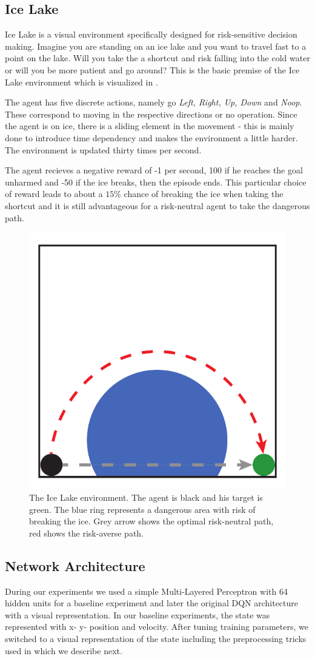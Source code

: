 \subsection{Ice Lake}
Ice Lake is a visual environment specifically designed for risk-sensitive decision making. Imagine you are standing on an ice lake and you want to travel fast to a point on the lake. Will you take the a shortcut and risk falling into the cold water or will you be more patient and go around? This is the basic premise of the Ice Lake environment which is visualized in .

The agent has five discrete actions, namely go \textit{Left, Right, Up, Down} and \textit{Noop}. These correspond to moving in the respective directions or no operation. Since the agent is on ice, there is a sliding element in the movement - this is mainly done to introduce time dependency and makes the environment a little harder. The environment is updated thirty times per second.

The agent recieves a negative reward of -1 per second, 100 if he reaches the goal unharmed and -50 if the ice breaks, then the episode ends. This particular choice of reward leads to about a $15\%$ chance of breaking the ice when taking the shortcut and it is still advantageous for a risk-neutral agent to take the dangerous path.

\begin{figure}[h]
\center
\includegraphics[width=0.3\linewidth]{gfx/icelake_still.pdf}
\caption{The Ice Lake environment. The agent is black and his target is green. The blue ring represents a dangerous area with risk of breaking the ice. Grey arrow shows the optimal risk-neutral path, red shows the risk-averse path.}
\label{fig:icelake}
\end{figure}

\subsection{Network Architecture}
During our experiments we used a simple Multi-Layered Perceptron with 64 hidden units for a baseline experiment and later the original DQN architecture with a visual representation. In our baseline experiments, the state was represented with x- y- position and velocity. After tuning training parameters, we switched to a visual representation of the state including the preprocessing tricks used in \citet{mnih2015human} which we describe next.


